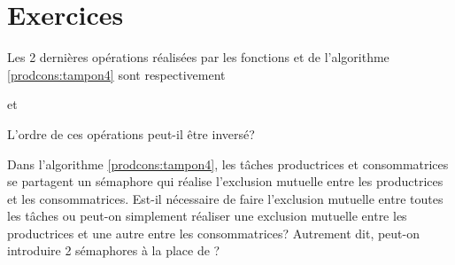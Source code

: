 \section{Exercices}

\startexercice

Les 2 dernières opérations réalisées par les fonctions  et  de l'algorithme \ref{prodcons:tampon4} sont respectivement \par
\hspace{1cm}  \par
\hspace{1cm}  \par
et \par
 \hspace{1cm}  \par
 \hspace{1cm}  \par
L'ordre de ces opérations peut-il être inversé?

\startexercice

Dans l'algorithme \ref{prodcons:tampon4}, les tâches productrices et consommatrices se partagent un sémaphore  qui réalise l'exclusion mutuelle entre les productrices et les consommatrices. Est-il nécessaire de faire l'exclusion mutuelle entre toutes les tâches ou peut-on simplement réaliser une exclusion mutuelle entre les productrices et une autre entre les consommatrices? Autrement dit, peut-on introduire 2 sémaphores à la place de ?
